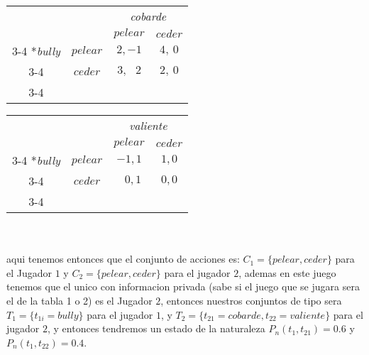 \documentclass[11pt]{article}
\begin{document}
\begin{flushleft}
\begin{example}
\begin{flushleft}
            \begin{minipage}{0.4\textwidth}
                \begin{center}    
                    \setlength{\extrarowheight}{0pt}
                    \begin{tabular}{cc|c|c|}
                        & \multicolumn{1}{c}{} & \multicolumn{2}{c}{\textit{cobarde}}\\
                        & \multicolumn{1}{c}{} & \multicolumn{1}{c}{$pelear$}  & \multicolumn{1}{c}{$ceder$} \\\cline{3-4}
                        \multirow{2}*{\textit{bully}}  & $pelear$ & $2,-1$ & $4,~0$ \\\cline{3-4}
                        & $ceder$ & $3,~~~2$ & $2,~0$ \\\cline{3-4}
                    \end{tabular}
                \end{center}
            \end{minipage}
            \begin{minipage}{0.4\textwidth}
                \begin{center}    
                    \setlength{\extrarowheight}{0pt}
                    \begin{tabular}{cc|c|c|}
                        & \multicolumn{1}{c}{} & \multicolumn{2}{c}{\textit{valiente}}\\
                        & \multicolumn{1}{c}{} & \multicolumn{1}{c}{$pelear$}  & \multicolumn{1}{c}{$ceder$} \\\cline{3-4}
                        \multirow{2}*{\textit{bully}}  & $pelear$ & $-1,1$ & $1,0$ \\\cline{3-4}
                        & $ceder$ & $~~~0,1$ & $0,0$ \\\cline{3-4}
                    \end{tabular}
                \end{center}
            \end{minipage}\\~\\
            
            aqui tenemos entonces que el conjunto de acciones es: $ C_1 = \{pelear,ceder\} $ para el Jugador $1$ y $ C_2 = \{pelear,ceder\} $ para el jugador $2$, ademas en este juego tenemos que el unico con informacion privada (sabe si el juego que se jugara sera el de la tabla 1  o 2) es el Jugador $2$, entonces nuestros conjuntos de tipo sera $T_1 = \{t_{1i} = bully\}$ para el jugador $1$, y $T_2=\{ t_{21}=cobarde, t_{22}=valiente \}$ para el jugador $2$, y entonces tendremos un estado de la naturaleza $P_n(t_1,t_{21}) = 0.6$ y $P_n(t_1,t_{22}) = 0.4$.\\~\\


\end{flushleft}
\end{example}
\end{flushleft}
\end{document}
